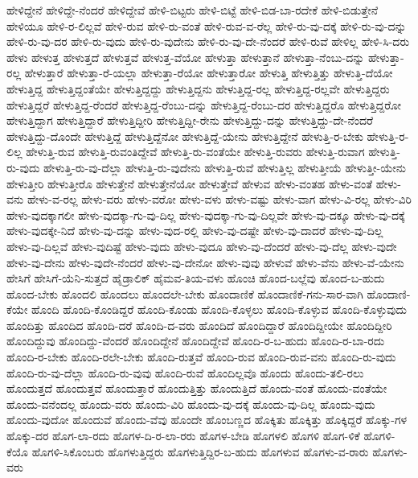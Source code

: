 ಹೇಳಿದ್ದೇನೆ
ಹೇಳಿದ್ದೇ-ನೆಂದರೆ
ಹೇಳಿದ್ದೇವೆ
ಹೇಳಿ-ಬಿಟ್ಟರು
ಹೇಳಿ-ಬಿಟ್ಟೆ
ಹೇಳಿ-ಬಿಡ-ಬಾ-ರದೇಕೆ
ಹೇಳಿ-ಬಿಡುತ್ತೇನೆ
ಹೇಳಿಯೂ
ಹೇಳಿ-ರ-ಲಿಲ್ಲವೆ
ಹೇಳಿ-ರುವ
ಹೇಳಿ-ರು-ವಂತೆ
ಹೇಳಿ-ರುವ-ವ-ರೆಲ್ಲ
ಹೇಳಿ-ರು-ವು-ದಕ್ಕೆ
ಹೇಳಿ-ರು-ವು-ದನ್ನು
ಹೇಳಿ-ರು-ವು-ದರ
ಹೇಳಿ-ರು-ವುದು
ಹೇಳಿ-ರು-ವುದೇನು
ಹೇಳಿ-ರು-ವು-ದೇ-ನೆಂದರೆ
ಹೇಳಿ-ರುವೆ
ಹೇಳಿಲ್ಲ
ಹೇಳಿ-ಸಿ-ದರು
ಹೇಳು
ಹೇಳುತ್ತ
ಹೇಳುತ್ತದೆ
ಹೇಳುತ್ತವೆ
ಹೇಳುತ್ತ-ವೆಯೋ
ಹೇಳುತ್ತಾ
ಹೇಳುತ್ತಾನೆ
ಹೇಳುತ್ತಾ-ನೆಂಬು-ದನ್ನು
ಹೇಳುತ್ತಾ-ರಲ್ಲ
ಹೇಳುತ್ತಾರೆ
ಹೇಳುತ್ತಾ-ರೆ-ಯಲ್ಲಾ
ಹೇಳುತ್ತಾ-ರೆಯೋ
ಹೇಳುತ್ತಾರೋ
ಹೇಳುತ್ತಿ
ಹೇಳುತ್ತಿತ್ತು
ಹೇಳುತ್ತಿ-ದೆಯೋ
ಹೇಳುತ್ತಿದ್ದ
ಹೇಳುತ್ತಿದ್ದಂತೆಯೇ
ಹೇಳುತ್ತಿದ್ದದ್ದು
ಹೇಳುತ್ತಿದ್ದನು
ಹೇಳುತ್ತಿದ್ದ-ರಲ್ಲ
ಹೇಳುತ್ತಿದ್ದ-ರಲ್ಲವೇ
ಹೇಳುತ್ತಿದ್ದರು
ಹೇಳುತ್ತಿದ್ದರೆ
ಹೇಳುತ್ತಿದ್ದ-ರೆಂದರೆ
ಹೇಳುತ್ತಿದ್ದ-ರೆಂಬು-ದನ್ನು
ಹೇಳುತ್ತಿದ್ದ-ರೆಂಬು-ದರ
ಹೇಳುತ್ತಿದ್ದರೊ
ಹೇಳುತ್ತಿದ್ದರೋ
ಹೇಳುತ್ತಿದ್ದಾಗ
ಹೇಳುತ್ತಿದ್ದಾರೆ
ಹೇಳುತ್ತಿದ್ದೀರಿ
ಹೇಳುತ್ತಿದ್ದೀ-ರೇನು
ಹೇಳುತ್ತಿದ್ದು-ದನ್ನು
ಹೇಳುತ್ತಿದ್ದು-ದೇ-ನೆಂದರೆ
ಹೇಳುತ್ತಿದ್ದು-ದೊಂದೇ
ಹೇಳುತ್ತಿದ್ದೆ
ಹೇಳುತ್ತಿದ್ದೆನೋ
ಹೇಳುತ್ತಿದ್ದೆ-ಯೇನು
ಹೇಳುತ್ತಿದ್ದೇನೆ
ಹೇಳುತ್ತಿ-ರ-ಬೇಕು
ಹೇಳುತ್ತಿ-ರ-ಲಿಲ್ಲ
ಹೇಳುತ್ತಿ-ರುವ
ಹೇಳುತ್ತಿ-ರುವಂತಿದ್ದೇವೆ
ಹೇಳುತ್ತಿ-ರು-ವಂತೆಯೇ
ಹೇಳುತ್ತಿ-ರುವರು
ಹೇಳುತ್ತಿ-ರುವಾಗ
ಹೇಳುತ್ತಿ-ರು-ವುದು
ಹೇಳುತ್ತಿ-ರು-ವು-ದೆಲ್ಲಾ
ಹೇಳುತ್ತಿ-ರು-ವುದೇನು
ಹೇಳುತ್ತಿ-ರುವೆ
ಹೇಳುತ್ತಿಲ್ಲ
ಹೇಳುತ್ತೀಯೆ
ಹೇಳುತ್ತೀ-ಯೇನು
ಹೇಳುತ್ತೀರಿ
ಹೇಳುತ್ತೀರೊ
ಹೇಳುತ್ತೇನೆ
ಹೇಳುತ್ತೇನೆಯೋ
ಹೇಳುತ್ತೇವೆ
ಹೇಳುವ
ಹೇಳು-ವಂತಹ
ಹೇಳು-ವಂತೆ
ಹೇಳು-ವನು
ಹೇಳು-ವ-ರಲ್ಲ
ಹೇಳು-ವರು
ಹೇಳು-ವರೋ
ಹೇಳು-ವಳು
ಹೇಳು-ವಷ್ಟು
ಹೇಳು-ವಾಗ
ಹೇಳು-ವಿ-ರಲ್ಲ
ಹೇಳು-ವಿರಿ
ಹೇಳು-ವುದಕ್ಕಾಗಲೀ
ಹೇಳು-ವುದಕ್ಕಾ-ಗು-ವು-ದಿಲ್ಲ
ಹೇಳು-ವುದಕ್ಕಾ-ಗು-ವು-ದಿಲ್ಲವೇ
ಹೇಳು-ವು-ದಕ್ಕೂ
ಹೇಳು-ವು-ದಕ್ಕೆ
ಹೇಳು-ವುದಕ್ಕೇ-ನಿದೆ
ಹೇಳು-ವು-ದನ್ನು
ಹೇಳು-ವುದ-ರಲ್ಲಿ
ಹೇಳು-ವು-ದಷ್ಟೇ
ಹೇಳು-ವು-ದಾದರೆ
ಹೇಳು-ವು-ದಿಲ್ಲ
ಹೇಳು-ವು-ದಿಲ್ಲವೆ
ಹೇಳು-ವುದಿಷ್ಟೆ
ಹೇಳು-ವುದು
ಹೇಳು-ವುದೂ
ಹೇಳು-ವು-ದೆಂದರೆ
ಹೇಳು-ವು-ದೆಲ್ಲ
ಹೇಳು-ವುದೇ
ಹೇಳು-ವು-ದೇನು
ಹೇಳು-ವುದೇ-ನೆಂದರೆ
ಹೇಳು-ವು-ದೇನೋ
ಹೇಳು-ವುವು
ಹೇಳುವೆ
ಹೇಳು-ವೆನು
ಹೇಳು-ವೆ-ಯೇನು
ಹೇಸಿಗೆ
ಹೇಸಿಗೆ-ಯೆನಿ-ಸುತ್ತದೆ
ಹೈಡ್ರಾಲಿಕ್
ಹೈಮವ-ತಿಯ-ವಳು
ಹೊಂಚಿ
ಹೊಂದ-ಬಲ್ಲೆವು
ಹೊಂದ-ಬ-ಹುದು
ಹೊಂದ-ಬೇಕು
ಹೊಂದಲಿ
ಹೊಂದಲು
ಹೊಂದಲೇ-ಬೇಕು
ಹೊಂದಾಣಿಕೆ
ಹೊಂದಾಣಿಕೆ-ಗನು-ಸಾರ-ವಾಗಿ
ಹೊಂದಾಣಿ-ಕೆಯೇ
ಹೊಂದಿ
ಹೊಂದಿ-ಕೊಂಡಿದ್ದರೆ
ಹೊಂದಿ-ಕೊಂಡು
ಹೊಂದಿ-ಕೊಳ್ಳಲು
ಹೊಂದಿ-ಕೊಳ್ಳುವ
ಹೊಂದಿ-ಕೊಳ್ಳುವುದು
ಹೊಂದಿತ್ತು
ಹೊಂದಿದ
ಹೊಂದಿ-ದರೆ
ಹೊಂದಿ-ದ-ವರು
ಹೊಂದಿದೆ
ಹೊಂದಿದ್ದಾರೆ
ಹೊಂದಿದ್ದೀಯೇ
ಹೊಂದಿದ್ದೀರಿ
ಹೊಂದಿದ್ದುವು
ಹೊಂದಿದ್ದು-ವೆಂದರೆ
ಹೊಂದಿದ್ದೇನೆ
ಹೊಂದಿದ್ದೇವೆ
ಹೊಂದಿ-ರ-ಬ-ಹುದು
ಹೊಂದಿ-ರ-ಬಾ-ರದು
ಹೊಂದಿ-ರ-ಬೇಕು
ಹೊಂದಿ-ರಲೇ-ಬೇಕು
ಹೊಂದಿ-ರುತ್ತವೆ
ಹೊಂದಿ-ರುವ
ಹೊಂದಿ-ರುವ-ವನು
ಹೊಂದಿ-ರು-ವುದು
ಹೊಂದಿ-ರು-ವು-ದೆಲ್ಲಾ
ಹೊಂದಿ-ರು-ವುವು
ಹೊಂದಿ-ರುವೆ
ಹೊಂದಿಲ್ಲವೊ
ಹೊಂದು
ಹೊಂದು-ತಲಿ-ರಲು
ಹೊಂದುತ್ತದೆ
ಹೊಂದುತ್ತವೆ
ಹೊಂದುತ್ತಾರೆ
ಹೊಂದುತ್ತಿತ್ತು
ಹೊಂದುತ್ತಿದೆ
ಹೊಂದು-ವಂತೆ
ಹೊಂದು-ವಂತೆಯೇ
ಹೊಂದು-ವನೆಂದಲ್ಲ
ಹೊಂದು-ವರು
ಹೊಂದು-ವಿರಿ
ಹೊಂದು-ವು-ದಕ್ಕೆ
ಹೊಂದು-ವು-ದಿಲ್ಲ
ಹೊಂದು-ವುದು
ಹೊಂದು-ವುದೋ
ಹೊಂದುವೆ
ಹೊಂದು-ವೆವು
ಹೊಂದೇ
ಹೊಂಬಣ್ಣದ
ಹೊಕ್ಕಿತು
ಹೊಕ್ಕಿತ್ತು
ಹೊಕ್ಕಿದ್ದರೆ
ಹೊಕ್ಕು-ಗಳ
ಹೊಕ್ಕು-ದರ
ಹೊಗ-ಲಾ-ರದು
ಹೊಗಳ-ದಿ-ರ-ಲಾ-ರರು
ಹೊಗಳ-ಬೇಡಿ
ಹೊಗಳಲಿ
ಹೊಗಳಿ
ಹೊಗ-ಳಿಕೆ
ಹೊಗಳಿ-ಕೆಯೊ
ಹೊಗಳಿ-ಸಿಕೊಂಬರು
ಹೊಗಳುತ್ತಿದ್ದರು
ಹೊಗಳುತ್ತಿದ್ದಿರ-ಬ-ಹುದು
ಹೊಗಳುವ
ಹೊಗಳು-ವ-ರಾರು
ಹೊಗಳು-ವರು
